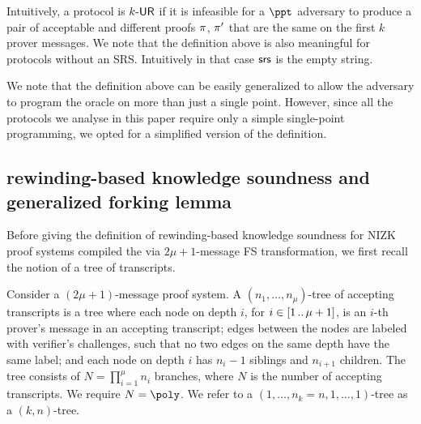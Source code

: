 Intuitively, a protocol is ${k\text{-}\mathsf{UR}}$ if it is infeasible for a $\ppt$ adversary to produce a pair of acceptable and different proofs $\pi$, $\pi'$ that are the same on the first $k$ prover messages.  We note that the definition above is also meaningful for protocols without an SRS. Intuitively in that case $\mathsf{srs}$ is the empty string.

We note that the definition above can be easily generalized to allow the adversary to program the oracle on more than just a single point. However, since all the protocols we analyse in this paper require only a simple single-point programming, we opted for a simplified version of the definition.
  

\subsection{rewinding-based knowledge soundness and generalized forking lemma}

Before giving the definition of rewinding-based knowledge soundness for NIZK proof systems compiled the via $2\mu + 1$-message FS transformation, we first recall the notion of a tree of transcripts.
\begin{definition}
	\label{def:tree_of_accepting_transcripts}
	Consider a $(2\mu + 1)$-message proof system.  A $(n_1,
  \ldots, n_\mu)$-tree of accepting transcripts is a tree where each node on
  depth $i$, for $i \in [1 \, .. \, \mu + 1]$, is an $i$-th prover's message in an
  accepting transcript; edges between the nodes are labeled with verifier's
  challenges, such that no two edges on the same depth have the same
  label; and each node on depth $i$ has $n_{i} - 1$ siblings and $n_{i +
    1}$ children. The tree consists of $N = \prod_{i = 1}^\mu n_i$
  branches, where $N$ is the number of accepting transcripts. We require $N = \poly$. We refer to a $(1, \ldots, n_k=n, 1, \ldots, 1)$-tree as a $(k,n)$-tree.
\end{definition}
 

